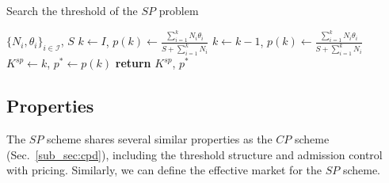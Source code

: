 \documentclass[twocolumn,10pt,twosided]{IEEEtran}
\begin{document}
\begin{algorithm}[htb]                     \caption{Search the threshold of the $SP$ problem}     \label{alg:2}
\begin{algorithmic}[1]
  {$\{N_i,\theta_i\}_{i\in{\mathcal{I}}}$, $S$}
    \State $k\gets I$, $p(k)\gets\frac{\sum_{i=1}^{k} N_i {\theta_i}}{S+\sum_{i=1}^{k}N_i}$
        \State $k \gets k-1$, $p(k)\gets\frac{\sum_{i=1}^{k} N_i {\theta_i}}{S+\sum_{i=1}^{k}N_i}$
    \EndWhile
    \State $K^{sp}\gets k$, $p^*\gets p(k)$
    \State \textbf{return} $K^{sp}$, $p^*$
\EndFunction
\end{algorithmic}                       \end{algorithm}

\subsection{Properties}
\label{sub_sp}
The $SP$ scheme shares several similar properties as
the $CP$ scheme (Sec.~\ref{sub_sec:cpd}), including the threshold structure and admission control with pricing. Similarly, we can define the effective market for the $SP$ scheme.
\end{document}
